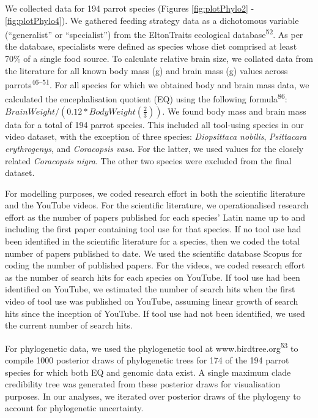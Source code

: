 \documentclass[
  man, donotrepeattitle,floatsintext]{apa6}
\begin{document}
We collected data for 194 parrot species (Figures
\ref{fig:plotPhylo2} - \ref{fig:plotPhylo4}). We gathered feeding strategy
data as a dichotomous variable (``generalist'' or ``specialist'') from the
EltonTraits ecological database\textsuperscript{52}. As per the database, specialists
were defined as species whose diet comprised at least 70\% of a single food
source. To calculate relative brain size, we collated data from the literature
for all known body mass (g) and brain mass (g) values across
parrots\textsuperscript{46--51}. For all species for which we obtained body and brain mass data, we
calculated the encephalisation quotient (EQ) using the following
formula\textsuperscript{86}: \(BrainWeight / (0.12 * BodyWeight(\frac{2}{3}))\). We
found body mass and brain mass data for a total of 194 parrot species. This
included all tool-using species in our video dataset, with the exception of
three species: \emph{Diopsittaca nobilis}, \emph{Psittacara erythrogenys}, and \emph{Coracopsis
vasa}. For the latter, we used values for the closely related \emph{Coracopsis
nigra}. The other two species were excluded from the final dataset.

For modelling purposes, we coded research effort in both the scientific
literature and the YouTube videos. For the scientific literature, we
operationalised research effort as the number of papers published for each
species' Latin name up to and including the first paper containing tool use for
that species. If no tool use had been identified in the scientific literature
for a species, then we coded the total number of papers published to date. We
used the scientific database Scopus for coding the number of published papers.
For the videos, we coded research effort as the number of search hits for each
species on YouTube. If tool use had been identified on YouTube, we estimated the
number of search hits when the first video of tool use was published on YouTube,
assuming linear growth of search hits since the inception of YouTube. If tool
use had not been identified, we used the current number of search hits.

For phylogenetic data, we used the phylogenetic tool at www.birdtree.org\textsuperscript{53} to compile 1000 posterior draws of phylogenetic trees for 174 of the
194 parrot species for which both EQ and genomic data exist. A single maximum
clade credibility tree was generated from these posterior draws for
visualisation purposes. In our analyses, we iterated over posterior draws of the
phylogeny to account for phylogenetic uncertainty.
\end{document}
